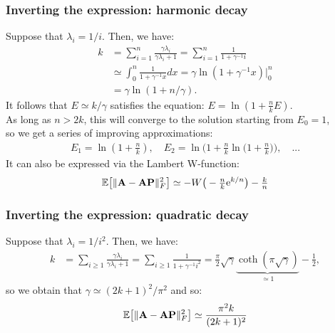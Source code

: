 \documentclass[10pt]{beamer}
\begin{document}
\begin{frame}
  \frametitle{Inverting the expression: harmonic decay}
  Suppose that $\lambda_i = 1/i$. Then, we have:
  \begin{align*}
    k&=  \sum_{i=1}^n \frac{\gamma\lambda_i}{\gamma\lambda_i+1}
=\sum_{i=1}^n\frac1{1 + \gamma^{-1}i}
      \\
      & \simeq \int_0^n \frac1{1+\gamma^{-1}x}dx
        =\gamma\ln(1+\gamma^{-1}x) \big|_0^n
    \\
    &= \gamma\ln(1+n/\gamma).
  \end{align*}
  It follows that $E \simeq k/\gamma$ satisfies the equation: $E =
  \ln(1+\frac nk E)$.\\
  As long as $n>2k$, this will converge to the solution starting from
  $E_0=1$, \\
  so we get a series of improving approximations:
  \begin{align*}
    E_1 = \ln(1+\tfrac nk),\quad E_2 = \ln\!\Big(1+\tfrac
    nk\ln\!\big(1+\tfrac nk\big)\Big),\quad ...
  \end{align*}
  It can also be expressed via the Lambert W-function:
  \begin{align*}
    \mathbb E\big[\|\mathbf A-\mathbf A\mathbf P\|_F^2\big]\simeq  -W\big(-\tfrac nk\mathrm{e}^{k/n}\big) - \tfrac kn
  \end{align*}
\end{frame}

\begin{frame}
  \frametitle{Inverting the expression: quadratic decay}
  Suppose that $\lambda_i = 1/i^2$. Then, we have:
  \begin{align*}
    k&=  \sum_{i\geq 1} \frac{\gamma\lambda_i}{\gamma\lambda_i+1}
=\sum_{i\geq 1}\frac1{1 + \gamma^{-1}i^2}
= \frac\pi 2 \sqrt\gamma \underbrace{\coth(\pi\sqrt\gamma)}_{\simeq 1} - \frac12,
  \end{align*}
  so we obtain that $\gamma \simeq (2k+1)^2/\pi^2$ and so:
  \begin{align*}
    \mathbb E\big[\|\mathbf A-\mathbf A\mathbf P\|_F^2\big]\simeq \frac{\pi^2 k}{(2k+1)^2}    
  \end{align*}
\end{frame}
\end{document}
